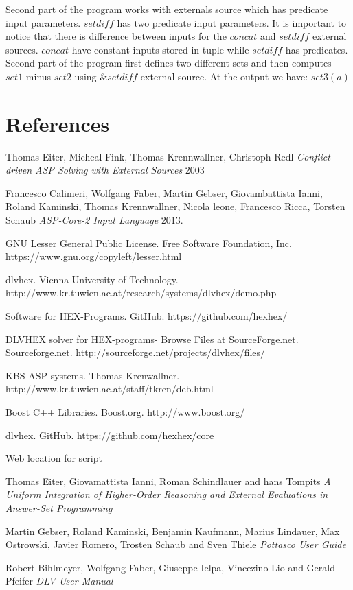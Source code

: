 \documentclass[14pt,a4paper, titlepage]{article}
\begin{document}
Second part of the program works with externals source which has predicate input parameters. $\mathit{setdiff}$ has two predicate input parameters. It is important to notice that there is difference between inputs for the $\mathit{concat}$ and $\mathit{setdiff}$ external sources. $\mathit{concat}$ have constant inputs stored in tuple while $\mathit{setdiff}$ has predicates. Second part of the program first defines two different sets and then computes $\mathit{set1}$ minus $\mathit{set2}$ using $\mathit{\&setdiff}$ external source. At the output we have: $\mathit{set3}(a)$ 




\newpage
\section{References}
\begin{thebibliography}{1}
 Thomas Eiter, Micheal Fink, Thomas Krennwallner, Christoph Redl {\em Conflict-driven ASP Solving with External Sources} 2003   
  
 Francesco Calimeri, Wolfgang Faber, Martin Gebser, Giovambattista Ianni, Roland Kaminski, Thomas Krennwallner, Nicola leone, Francesco Ricca, Torsten Schaub {\em ASP-Core-2 Input Language} 2013.

 GNU Lesser General Public License. Free Software Foundation, Inc. https://www.gnu.org/copyleft/lesser.html 

dlvhex. Vienna University of Technology. http://www.kr.tuwien.ac.at/research/systems/dlvhex/demo.php 

Software for HEX-Programs. GitHub. https://github.com/hexhex/ 

DLVHEX solver for HEX-programs-  Browse Files at SourceForge.net. Sourceforge.net. http://sourceforge.net/projects/dlvhex/files/

KBS-ASP systems. Thomas Krenwallner. http://www.kr.tuwien.ac.at/staff/tkren/deb.html

Boost C++ Libraries. Boost.org. http://www.boost.org/

dlvhex. GitHub. https://github.com/hexhex/core

Web location for script

Thomas Eiter, Giovamattista Ianni, Roman Schindlauer and hans Tompits {\em A Uniform Integration of Higher-Order Reasoning and External Evaluations in Answer-Set Programming} 


Martin Gebser, Roland Kaminski, Benjamin Kaufmann, Marius Lindauer, Max Ostrowski, Javier Romero, Trosten Schaub and Sven Thiele {\em Pottasco User Guide}

Robert Bihlmeyer, Wolfgang Faber, Giuseppe Ielpa, Vincezino Lio and Gerald Pfeifer {\em DLV-User Manual} 
      
 
 \end{thebibliography} 
\end{document}
